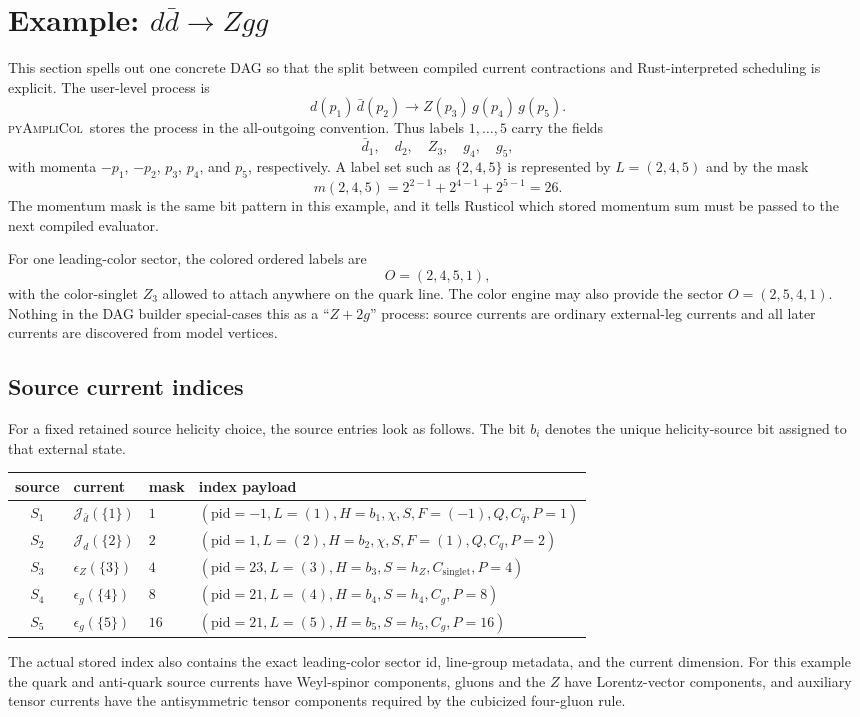 \documentclass[10pt]{article}
\newcommand{\PAC}{\textsc{pyAmpliCol}}
\newcommand{\J}{\mathcal{J}}
\begin{document}
\section{Example: \texorpdfstring{$d\bar d\to Zgg$}{d dbar -> Z g g}}

This section spells out one concrete DAG so that the split between compiled
current contractions and Rust-interpreted scheduling is explicit.  The
user-level process is
\[
  d(p_1)\,\bar d(p_2)\to Z(p_3)\,g(p_4)\,g(p_5).
\]
\PAC\ stores the process in the all-outgoing convention.  Thus labels
$1,\ldots,5$ carry the fields
\[
  \bar d_1,\quad d_2,\quad Z_3,\quad g_4,\quad g_5,
\]
with momenta $-p_1$, $-p_2$, $p_3$, $p_4$, and $p_5$, respectively.  A
label set such as $\{2,4,5\}$ is represented by
$L=(2,4,5)$ and by the mask
\[
  m(2,4,5)=2^{2-1}+2^{4-1}+2^{5-1}=26.
\]
The momentum mask is the same bit pattern in this example, and it tells
Rusticol which stored momentum sum must be passed to the next compiled
evaluator.

For one leading-color sector, the colored ordered labels are
\[
  O=(2,4,5,1),
\]
with the color-singlet $Z_3$ allowed to attach anywhere on the quark line.
The color engine may also provide the sector $O=(2,5,4,1)$.  Nothing in the
DAG builder special-cases this as a ``$Z+2g$'' process: source currents are
ordinary external-leg currents and all later currents are discovered from
model vertices.

\subsection*{Source current indices}

For a fixed retained source helicity choice, the source entries look as follows.
The bit $b_i$ denotes the unique helicity-source bit assigned to that external
state.
\begin{center}
\begin{tabular}{@{}c L{1.4in} L{0.85in} L{2.85in}@{}}
\toprule
\textbf{source} & \textbf{current} & \textbf{mask} & \textbf{index payload} \\
\midrule
$S_1$ & $\J_{\bar d}(\{1\})$ & $1$ &
$(\mathrm{pid}=-1,L=(1),H=b_1,\chi,S,F=(-1),Q,C_{\bar q},P=1)$ \\
$S_2$ & $\J_d(\{2\})$ & $2$ &
$(\mathrm{pid}=1,L=(2),H=b_2,\chi,S,F=(1),Q,C_q,P=2)$ \\
$S_3$ & $\epsilon_Z(\{3\})$ & $4$ &
$(\mathrm{pid}=23,L=(3),H=b_3,S=h_Z,C_{\mathrm{singlet}},P=4)$ \\
$S_4$ & $\epsilon_g(\{4\})$ & $8$ &
$(\mathrm{pid}=21,L=(4),H=b_4,S=h_4,C_g,P=8)$ \\
$S_5$ & $\epsilon_g(\{5\})$ & $16$ &
$(\mathrm{pid}=21,L=(5),H=b_5,S=h_5,C_g,P=16)$ \\
\bottomrule
\end{tabular}
\end{center}
The actual stored index also contains the exact leading-color sector id,
line-group metadata, and the current dimension.  For this example the quark
and anti-quark source currents have Weyl-spinor components, gluons and the
$Z$ have Lorentz-vector components, and auxiliary tensor currents have the
antisymmetric tensor components required by the cubicized four-gluon rule.
\end{document}
